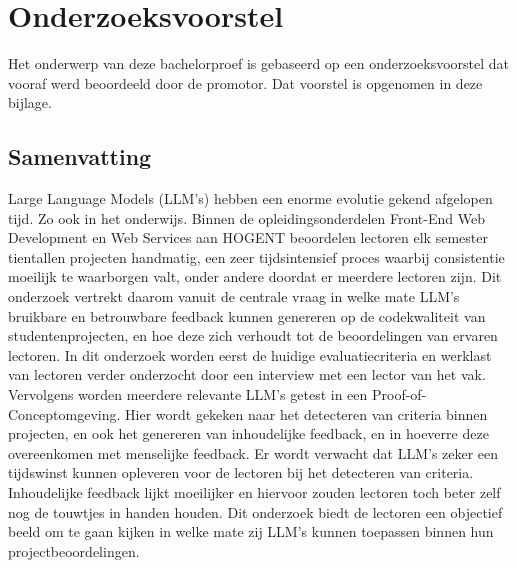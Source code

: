 \documentclass[dutch,dit,thesis]{hogentreport}
\begin{document}
\chapter{Onderzoeksvoorstel}

Het onderwerp van deze bachelorproef is gebaseerd op een onderzoeksvoorstel dat vooraf werd beoordeeld door de promotor. Dat voorstel is opgenomen in deze bijlage.

\section*{Samenvatting}

Large Language Models (LLM's) hebben een enorme evolutie gekend afgelopen tijd. Zo ook in het onderwijs. Binnen de opleidingsonderdelen Front-End Web Development en Web Services aan HOGENT beoordelen lectoren elk semester tientallen projecten handmatig, een zeer tijdsintensief proces waarbij consistentie moeilijk te waarborgen valt, onder andere doordat er meerdere lectoren zijn. Dit onderzoek vertrekt daarom vanuit de centrale vraag in welke mate LLM's bruikbare en betrouwbare feedback kunnen genereren op de codekwaliteit van studentenprojecten, en hoe deze zich verhoudt tot de beoordelingen van ervaren lectoren. In dit onderzoek worden eerst de huidige evaluatiecriteria en werklast van lectoren verder onderzocht door een interview met een lector van het vak. Vervolgens worden meerdere relevante LLM's getest in een Proof-of-Conceptomgeving. Hier wordt gekeken naar het detecteren van criteria binnen projecten, en ook het genereren van inhoudelijke feedback, en in hoeverre deze overeenkomen met menselijke feedback. Er wordt verwacht dat LLM's zeker een tijdswinst kunnen opleveren voor de lectoren bij het detecteren van criteria. Inhoudelijke feedback lijkt moeilijker en hiervoor zouden lectoren toch beter zelf nog de touwtjes in handen houden. Dit onderzoek biedt de lectoren een objectief beeld om te gaan kijken in welke mate zij LLM's kunnen toepassen binnen hun projectbeoordelingen.



%


\backmatter{}

\setlength\bibitemsep{2pt} %
\printbibliography[heading=bibintoc]
\end{document}
